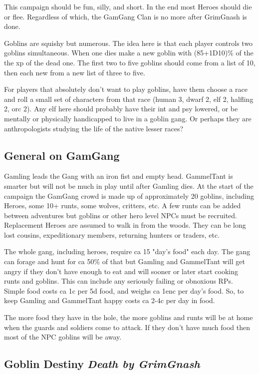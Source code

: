 This campaign should be fun, silly, and short. In the end most Heroes should die or flee. Regardless of which, the GamGang Clan is no more after GrimGnash is done.

Goblins are squishy but numerous. The idea here is that each player controls two goblins simultaneous. When one dies make a new goblin with (85+1D10)\% of the the xp of the dead one. The first two to five goblins should come from a list of 10, then each new from a new list of three to five.

For players that absolutely don't want to play goblins, have them choose a race and roll a small set of characters from that race (human 3, dwarf 2, elf 2, halfling 2, orc 2). Any elf here should probably have their int and psy lowered, or be mentally or physically handicapped to live in a goblin gang. Or perhaps they are anthropologists studying the life of the native lesser races?


\subsection*{General on GamGang}

Gamling leads the Gang with an iron fist and empty head. GammelTant is smarter but will not be much in play until after Gamling dies.
At the start of the campaign the GamGang crowd is made up of approximately 20 goblins, including Heroes, some 10+ runts, some wolves, critters, etc. A few runts can be added between adventures but goblins or other hero level NPCs must be recruited. Replacement Heroes are assumed to walk in from the woods. They can be long lost cousins, expeditionary members, returning hunters or traders, etc.

The whole gang, including heroes, require ca 15 "day's food" each day. The gang can forage and hunt for ca 50\% of that but Gamling and GammelTant will get angry if they don't have enough to eat and will sooner or later start cooking runts and goblins. This can include any seriously failing or obnoxious RPs.
Simple food costs ca 1c per 5d food, and weighs ca 1enc per day's food. So, to keep Gamling and GammelTant happy costs ca 2-4c per day in food.

The more food they have in the hole, the more goblins and runts will be at home when the guards and soldiers come to attack. If they don't have much food then most of the NPC goblins will be away.


\subsection*{Goblin Destiny\,\textendash\,\emph{Death by GrimGnash}}

